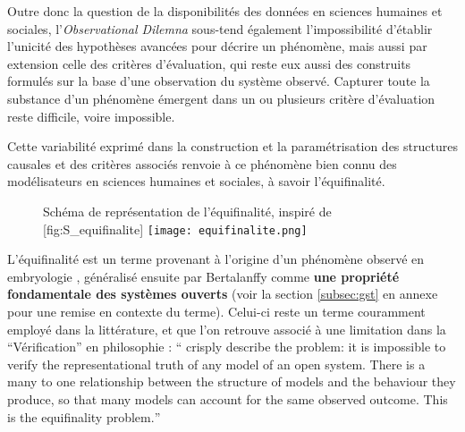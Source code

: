 Outre donc la question de la disponibilités des données en sciences humaines et sociales, l'\textit{Observational Dilemna} sous-tend également l'impossibilité d'établir l'unicité des hypothèses avancées pour décrire un phénomène, mais aussi par extension celle des critères d'évaluation, qui reste eux aussi des construits formulés sur la base d'une observation du système observé. Capturer toute la substance d'un phénomène émergent dans un ou plusieurs critère d'évaluation reste difficile, voire impossible.

Cette variabilité exprimé dans la construction et la paramétrisation des structures causales et des critères associés renvoie à ce phénomène bien connu des modélisateurs en sciences humaines et sociales, à savoir l'équifinalité.

\begin{figure}[htbp]
\begin{sidecaption}[fortoc]{Schéma de représentation de l'équifinalité, inspiré de \autocite{Richardson2002}}[fig:S_equifinalite]
  \centering
 \texttt{[image: equifinalite.png]}
  \end{sidecaption}
\end{figure}

L'équifinalité est un terme provenant à l'origine d'un phénomène observé en embryologie , généralisé ensuite par Bertalanffy comme \textbf{une propriété fondamentale des systèmes ouverts} (voir la section \ref{subsec:gst} en annexe pour une remise en contexte du terme). Celui-ci reste un terme couramment employé dans la littérature, et que l'on retrouve associé à une limitation dans la \enquote{Vérification}  en philosophie : \foreignquote{english}{\textcite{Oreskes1994} crisply describe the problem: it is impossible to verify the representational truth of any model of an open system. There is a many to one relationship between the structure of models and the behaviour they produce, so that many models can account for the same observed outcome. This is the equifinality problem.} \autocite{OSullivan2004}



